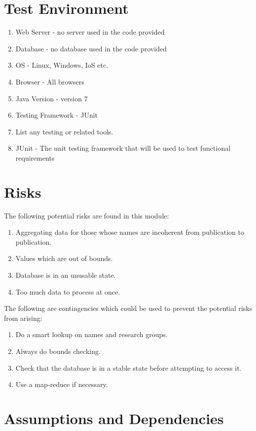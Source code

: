 \section{Test Environment} 

\begin{enumerate} 
	\item Web Server - no server used in the code provided
	\item Database - no database used in the code provided
	\item OS - Linux, Windows, IoS etc.
	\item Browser - All browsers
	\item Java Version - version 7
	\item Testing Framework - JUnit
	\item List any testing or related tools.
	\item JUnit - The unit testing framework that will be used to test functional requirements
\end{enumerate}

\section{Risks}
	The following potential risks are found in this module:
\begin{enumerate}
	\item Aggregating data for those whose names are incoherent from publication to publication.
	\item Values  which are out of bounds.
	\item Database is in an unusable state.
	\item Too much data to process at once.
\end{enumerate}

	The following are contingencies which could be used to prevent the potential risks from arising:
\begin{enumerate}

	\item Do a smart lookup on names and research groups.
	\item Always do bounds checking.
	\item Check that the database is in a stable state before attempting to access it.
	\item Use a map-reduce if necessary.
         

\end{enumerate} 

\section{Assumptions and Dependencies}

